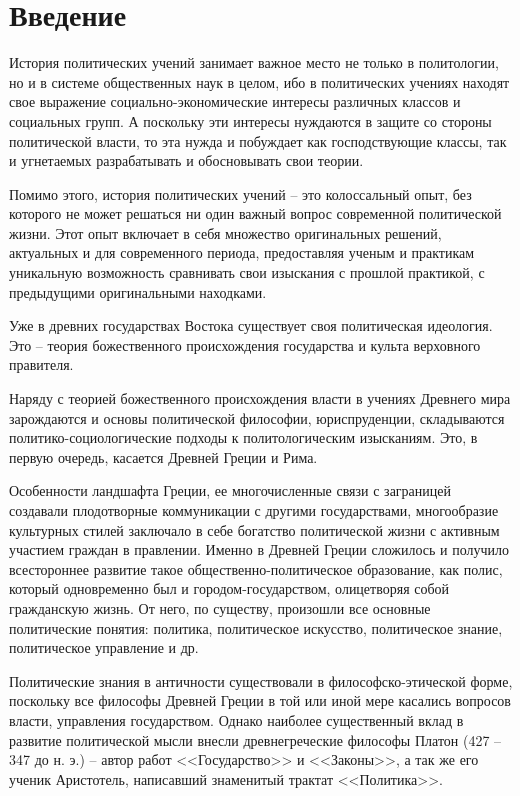 \chapter{Введение}

	История политических учений занимает важное место не только в политологии, 
	но и в системе общественных наук в целом, ибо в политических учениях 
	находят свое выражение социально-экономические интересы различных классов 
	и социальных групп. А поскольку эти интересы нуждаются в защите со 
	стороны политической власти, то эта нужда и побуждает как господствующие 
	классы, так и угнетаемых разрабатывать и обосновывать свои теории.

	Помимо этого, история политических учений -- это колоссальный опыт, без 
	которого не может решаться ни один важный вопрос современной политической 
	жизни. Этот опыт включает в себя множество оригинальных решений, 
	актуальных и для современного периода, предоставляя ученым и практикам 
	уникальную возможность сравнивать свои изыскания с прошлой практикой, с 
	предыдущими оригинальными находками.

	Уже в древних государствах Востока существует своя политическая идеология. 
	Это -- теория божественного происхождения государства и культа верховного 
	правителя.

	Наряду с теорией божественного происхождения власти в учениях Древнего мира 
	зарождаются и основы политической философии, юриспруденции, складываются 
	политико-социологические подходы к политологическим изысканиям. Это, в 
	первую очередь, касается Древней Греции и Рима.

	Особенности ландшафта Греции, ее многочисленные связи с заграницей 
	создавали плодотворные коммуникации с другими государствами, многообразие 
	культурных стилей заключало в себе богатство политической жизни с активным 
	участием граждан в правлении. Именно в Древней Греции сложилось и получило 
	всестороннее развитие такое общественно-политическое образование, как 
	полис, который одновременно был и городом-государством, олицетворяя собой 
	гражданскую жизнь. От него, по существу, произошли все основные 
	политические понятия: политика, политическое искусство, политическое 
	знание, политическое управление и др.

	Политические знания в античности существовали в философско-этической форме, 
	поскольку все философы Древней Греции в той или иной мере касались вопросов 
	власти, управления государством. Однако наиболее существенный вклад в 
	развитие политической мысли внесли древнегреческие философы Платон 
	(427 -- 347 до н. э.) -- автор работ <<Государство>> и <<Законы>>, а так же 
	его ученик Аристотель, написавший знаменитый трактат <<Политика>>.

